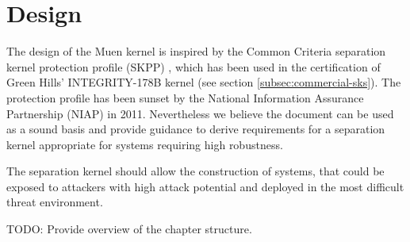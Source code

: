 \chapter{Design}\label{chap:design}
The design of the Muen kernel is inspired by the Common Criteria separation
kernel protection profile (SKPP) \cite{SKPP}, which has been used in the
certification of Green Hills' INTEGRITY-178B kernel (see section
\ref{subsec:commercial-sks}). The protection profile has been sunset by the
National Information Assurance Partnership (NIAP) in 2011. Nevertheless we
believe the document can be used as a sound basis and provide guidance to
derive requirements for a separation kernel appropriate for systems requiring
high robustness.

The separation kernel should allow the construction of systems, that could be
exposed to attackers with high attack potential and deployed in the most
difficult threat environment.

TODO: Provide overview of the chapter structure.





